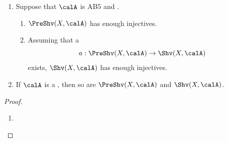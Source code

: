 \begin{proposition}
\begin{enumerate}
\begin{enumerate}
            exists. Further suppose that $a$ is exact for $n \in \{4,5\}$, $\Shv(X, \calA)$ is AB$n$. In particular, the exactness condition is not needed for $n = 3$. Moreover, the exactness condition is always satisfied for $n = 5$.
        \end{enumerate}
        \item Suppose that $\calA$ is AB$5$ and .
        \begin{enumerate}
            \item $\PreShv(X, \calA)$ has enough injectives.
            \item Assuming that a  
                $$a: \PreShv(X, \calA) \to \Shv(X, \calA) $$
            exists, $\Shv(X, \calA)$ has enough injectives.
        \end{enumerate}
        \item If $\calA$ is a , then so are $\PreShv(X, \calA)$ and $\Shv(X, \calA)$.
    \end{enumerate}
\end{proposition}

\begin{proof}
    \begin{enumerate}
        \item  \TODO{}
    \end{enumerate}
\end{proof}
